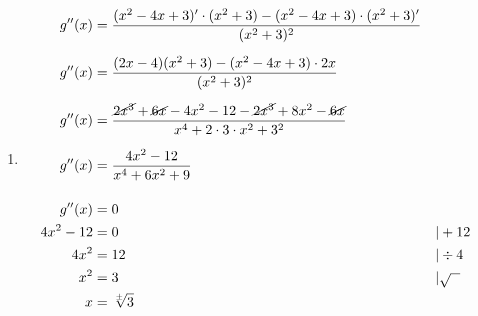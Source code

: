 \documentclass[11pt,a4paper]{report}
\newcommand{\m}{\cdot}
\newcommand{\opgd}[1]{\item[#1)]}
\begin{document}
\begin{enumerate}[leftmargin=*,itemsep=1cm,labelsep=2em,label=\alph*)]

\opgd{c}
\begin{align*}
g''(x) &= \frac{(x^2 - 4x + 3)' \m (x^2 + 3) - (x^2 - 4x + 3) \m (x^2 + 3)'}{(x^2 + 3)^2}\\[0.2 cm]
g''(x) &= \frac{ (2x - 4) (x^2 + 3) - (x^2 - 4x + 3) \m 2x }{(x^2 + 3)^2}\\[0.2 cm]
g''(x) &= \frac{ \cancel{2x^3} + \cancel{6x} - 4x^2 - 12 - \cancel{2x^3} + 8x^2 - \cancel{6x} }{ x^4 + 2 \m 3 \m x^2 + 3^2 }\\[0.2 cm]
g''(x) &= \frac{ 4x^2 - 12 }{ x^4 + 6x^2 + 9 }\\[0.4 cm]
g''(x) &= 0\\
4x^2 - 12 &= 0 &&| + 12\\
4x^2 &= 12 &&| \div 4\\
x^2 &= 3 &&| \sqrt{\ \ }\\
x &= \sqrt[\pm]{3}
\end{align*}


\end{enumerate}

\end{document}
